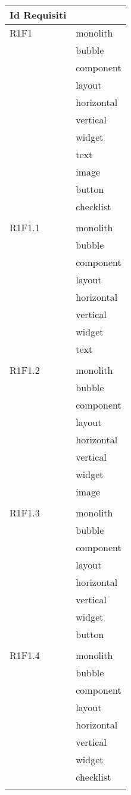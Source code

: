 \begin{center}
	\begin{longtable}{|p{7cm}|p{5cm}|}\hline
		Id Requisiti & \termine{Package} \\ \hline
		R1F1 & monolith \\ & bubble \\ & component \\ & layout \\ & horizontal \\ & vertical \\ & widget \\ & text \\ & image \\ & button \\ & checklist \\ & \\ \hline
		R1F1.1 & monolith \\ & bubble \\ & component \\ & layout \\ & horizontal \\ & vertical \\ & widget \\ & text \\ & \\ \hline
		R1F1.2 & monolith \\ & bubble \\ & component \\ & layout \\ & horizontal \\ & vertical \\ & widget \\ & image \\ & \\ \hline
		R1F1.3 & monolith \\ & bubble \\ & component \\ & layout \\ & horizontal \\ & vertical \\ & widget \\ & button \\ & \\ \hline
		R1F1.4 & monolith \\ & bubble \\ & component \\ & layout \\ & horizontal \\ & vertical \\ & widget \\ & checklist \\ & \\ \hline

\end{longtable}
\end{center}
